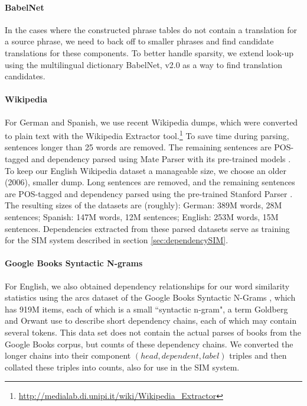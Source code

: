 \documentclass[11pt,a4paper]{article}
\begin{document}
\paragraph{BabelNet} %

In the cases where the constructed phrase tables do not contain a translation
for a source phrase, we need to back off to smaller phrases and find
candidate translations for these components.  To better handle sparsity, we
extend look-up using the multilingual dictionary BabelNet, v2.0
\cite{Navigli:Ponzetto:12} as a way to find translation candidates.

\paragraph{Wikipedia} %

For German and Spanish, we use recent Wikipedia dumps, which were converted to
plain text with the Wikipedia Extractor
tool.\footnote{\url{http://medialab.di.unipi.it/wiki/Wikipedia_Extractor}} To
save time during parsing, sentences longer than 25 words are removed. The
remaining sentences are POS-tagged and dependency parsed using Mate Parser with
its pre-trained models \cite{bohnet:10,bohnet:kuhn:12,seeker:kuhn:13}. To keep
our English Wikipedia dataset a manageable size, we choose an older (2006),
smaller dump. Long sentences are removed, and
the remaining sentences are POS-tagged and dependency parsed using the
pre-trained Stanford Parser \cite{klein:manning:03,marneffe:maccartney:ea:06}.
The resulting sizes of the datasets are (roughly): German: 389M words, 28M
sentences; Spanish: 147M words, 12M sentences; English: 253M words, 15M
sentences. Dependencies extracted from these parsed datasets serve as training
for the SIM system described in section \ref{sec:dependencySIM}.

\paragraph{Google Books Syntactic N-grams}

For English, we also obtained dependency relationships for our word similarity
statistics using the arcs dataset of the Google Books Syntactic N-Grams
\cite{goldberg:orwant:13}, which has 919M items, each of which is a small
``syntactic n-gram", a term Goldberg and Orwant use to describe short
dependency chains, each of which may contain several tokens. This data set does
not contain the actual parses of books from the Google Books corpus, but counts
of these dependency chains. We converted the longer chains into their component
$(head,dependent,label)$ triples and then collated these triples into counts,
also for use in the SIM system.
\end{document}

